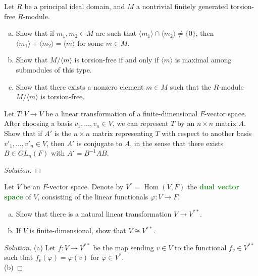\documentclass[10pt]{article}
\providecommand{\ii}{\item}
\providecommand{\inv}{^{-1}}
\newenvironment{soln}{\begin{proof}[Solution]}{\end{proof}}
\providecommand{\vocab}[1]{{\textbf{\textcolor{ForestGreen}{#1}}}}
\providecommand{\Hom}{\operatorname{Hom}}
\begin{document}
\begin{problem}
    Let $R$ be a principal ideal domain,
    and $M$ a nontrivial finitely generated torsion-free $R$-module.
    \begin{enumerate}[(a)]
        \ii Show that if $m_1,m_2\in M$ are such that
	$\langle m_1\rangle\cap\langle m_2\rangle \ne \{0\}$,
	then $\langle m_1\rangle + \langle m_2\rangle = \langle m\rangle$
	for some $m\in M$.
	\ii Show that $M/\langle m\rangle$ is torsion-free
	if and only if $\langle m\rangle$ is maximal among submodules of this type.
	\ii Show that there exists a nonzero element $m\in M$
	such that the $R$-module $M/\langle m\rangle$ is torsion-free.
    \end{enumerate}
\end{problem}

\begin{problem}
    Let $T\colon V\to V$ be a linear transformation of
    a finite-dimensional $F$-vector space.
    After choosing a basis $v_1,\dots,v_n\in V$,
    we can represent $T$ by an $n\times n$ matrix $A$.
    Show that if $A'$ is the $n\times n$ matrix representing
    $T$ with respect to another basis $v'_1,\dots,v'_n\in V$,
    then $A'$ is conjugate to $A$, in the sense that
    there exists $B\in GL_n(F)$ with $A' = B\inv AB$.
\end{problem}

\begin{soln}
\end{soln}

\begin{problem}
    Let $V$ be an $F$-vector space.
    Denote by $V^* = \Hom(V,F)$ the \vocab{dual vector space} of $V$,
    consisting of the linear functionals $\varphi\colon V\to F$.
    \begin{enumerate}[(a)]
	\ii Show that there is a natural linear transformation $V\to V^{**}$.
	\ii If $V$ is finite-dimensional, show that $V\cong V^{**}$.
    \end{enumerate}
\end{problem}

\begin{soln}
    (a) Let $f\colon V\to V^{**}$ be the map sending
    $v\in V$ to the functional $f_v\in V^{**}$
    such that $f_v(\varphi) = \varphi(v)$ for $\varphi\in V^*$.
    \\

    (b) 
\end{soln}
\end{document}
